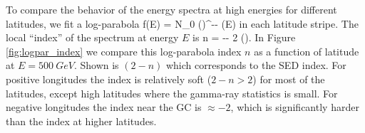 To compare the behavior of the energy spectra at high energies for different latitudes, 
we fit a log-parabola
 \be
 f(E) = N_0 \left(\right)^{-\alpha - \beta \ln(E)}
 \ee
in each latitude stripe. The local ``index'' of the spectrum at energy $E$ is
 \be 
n \equiv {} = -\alpha - 2 \beta \ln\left(\right).
 \ee
In Figure \ref{fig:logpar_index} we compare this log-parabola index $n$ as a function of latitude at $E = \SI{500}{GeV}$. 
Shown is $(2 - n)$ which corresponds to the SED index.
For positive longitudes the index is relatively soft ($2-n > 2$) for most of the latitudes, 
except high latitudes where the gamma-ray statistics is small.
For negative longitudes the index near the GC is $\approx -2$, 
which is significantly harder than the index at higher latitudes.
